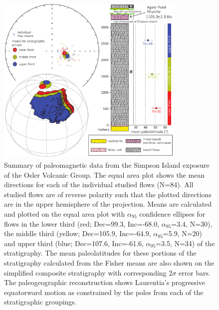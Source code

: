 \documentclass[draft,gc]{AGUTeX}
\begin{document}
\begin{figure}
\noindent\includegraphics[width=0.8\textwidth]{2014_Osler_Figures/OslerStrat&EA.pdf}
\caption{Summary of paleomagnetic data from the Simpson Island exposure of the Osler Volcanic Group. The equal area plot shows the mean directions for each of the individual studied flows (N=84). All studied flows are of reverse polarity such that the plotted directions are in the upper hemisphere of the projection. Means are calculated and plotted on the equal area plot with $\alpha_{95}$ confidence ellipses for flows in the lower third (red; Dec=99.3, Inc=-68.0, $\alpha_{95}$=3.4, N=30), the middle third (yellow; Dec=105.9, Inc=-64.9, $\alpha_{95}$=5.9, N=20) and upper third (blue; Dec=107.6, Inc=-61.6, $\alpha_{95}$=3.5, N=34) of the stratigraphy. The mean paleolatitudes for these portions of the stratigraphy calculated from the Fisher means are also shown on the simplified composite stratigraphy with corresponding 2$\sigma$ error bars. The paleogeographic reconstruction shows Laurentia's progressive equatorward motion as constrained by the poles from each of the stratigraphic groupings.}
\label{fig:summary}
\end{figure}


%
%

\end{document}
